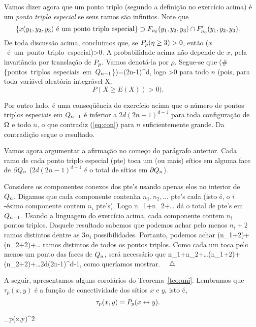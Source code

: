 Vamos dizer agora que um ponto triplo (segundo a definição no exercício acima)
é um {\em ponto triplo especial} se seus ramos são infinitos.
Note que
$$
\{\mbox{$x(y_1,y_2,y_3)$ é um ponto triplo especial}\}\supset F_{n_0}(y_1,y_2,y_3)\cap F'_{n_0}(y_1,y_2,y_3).
$$
De toda discussão acima, concluimos que, se $P_p(\eta\geq3)>0$,
então
\beq
\p(\mbox{$x$ é um ponto triplo especial})>0.
\eeq
A probabilidade acima não depende de $x$, pela invariância por translação
de $P_p$. Vamos denotá-la por $\rho$.
Segue-se que
\beq
\ep(\mbox{\#\{pontos triplos especiais em $\qnm$}\})=(2n-1)^d\rho,
\eeq
logo
\beq
\label{eq:con}
>0
\eeq
para todo $n$ (pois, para toda variável aleatória integrável X, 
$$P(X\geq E(X))>0).$$

Por outro lado, é uma conseqüência do exercício acima que o número de pontos
triplos especiais em $Q_{n-1}$ é inferior a $2d(2n-1)^{d-1}$ para toda
configuração de $\Omega$ e todo $n$, o que contradiz 
(\ref{eq:con}) para $n$ suficientemente grande. 
Da contradição segue o resultado.

Vamos agora argumentar a afirmação no começo do parágrafo anterior.
Cada ramo de cada ponto triplo especial (pte) toca um (ou mais) sítios
em alguma face de $\partial Q_n$ ($2d(2n-1)^{d-1}$ é o total de  
sítios em $\partial Q_n$).

Considere os componentes conexos dos pte's usando apenas elos no interior
de $Q_n$. Digamos que cada componente contenha $n_1,n_2,\ldots$ pte's
cada (isto é, o $i$-ésimo componente contem $n_i$ pte's). Logo
\beq
n_1+n_2+\ldots
\eeq
dá o total de pte's em $Q_{n-1}$.
Usando a linguagem do exercício acima, cada componente contem $n_i$ pontos
triplos. Daquele resultado sabemos que podemos achar pelo menos $n_i+2$
ramos distintos dentre as $3n_i$ possibilidades. Portanto, podemos achar
\beq
(n_1+2)+(n_2+2)+\ldots
\eeq 
ramos distintos de todos os pontos triplos. Como cada um toca pelo menos
um ponto das faces de $Q_n$, será necessário que
\beq
n_1+n_2+\ldots\leq(n_1+2)+(n_2+2)+\ldots\leq2d(2n-1)^{d-1},
\eeq
como queríamos mostrar. $\quad\triangle$

\vspace{.5cm}

A seguir, apresentamos alguns corolários do Teorema~\ref{teo:uni}.
Lembramos que $\tau_p(x,y)$ é a função de conectividade dos sítios
$x$ e $y$, isto é,
$$\tau_p(x,y)=P_p(x\leftrightarrow y).$$

\vs

\bco
\beq
\tau_p(x,y)\geq[\tep]^2
\eeq
\eco

